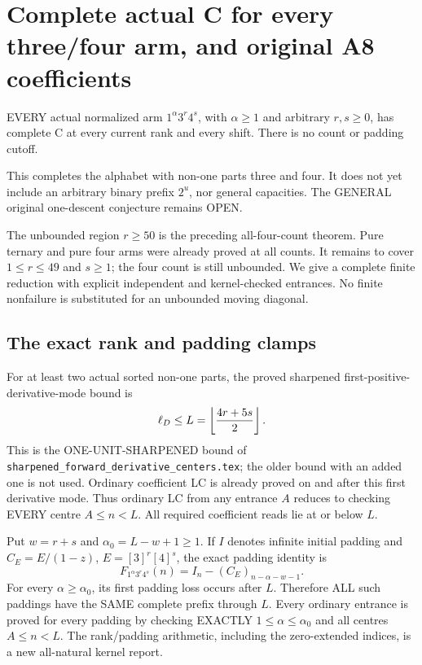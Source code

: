 \section{Complete actual C for every three/four arm, and original A8 coefficients}
\begin{theorem}
EVERY actual normalized arm $1^\alpha3^r4^s$, with
$\alpha\ge1$ and arbitrary $r,s\ge0$, has complete C at every
current rank and every shift. There is no count or padding cutoff.
\end{theorem}
This completes the alphabet with non-one parts three and four.
It does not yet include an arbitrary binary prefix $2^u$, nor general
capacities. The GENERAL original one-descent conjecture remains OPEN.

The unbounded region $r\ge50$ is the preceding all-four-count theorem.
Pure ternary and pure four arms were already proved at all counts.
It remains to cover $1\le r\le49$ and $s\ge1$; the four count is still
unbounded. We give a complete finite reduction with explicit independent
and kernel-checked entrances. No finite nonfailure is substituted for
an unbounded moving diagonal.

\subsection{The exact rank and padding clamps}
For at least two actual sorted non-one parts, the proved sharpened
first-positive-derivative-mode bound is
\[
 \ell_D\le L=\left\lfloor{4r+5s\over2}\right\rfloor.
\]
This is the ONE-UNIT-SHARPENED bound of
\texttt{sharpened\_forward\_derivative\_centers.tex}; the older bound
with an added one is not used. Ordinary coefficient LC is already
proved on and after this first derivative mode. Thus ordinary LC
from any entrance $A$ reduces to checking EVERY centre $A\le n<L$.
All required coefficient reads lie at or below $L$.

Put $w=r+s$ and $\alpha_0=L-w+1\ge1$.
If $I$ denotes infinite initial padding and $C_E=E/(1-z)$,
$E=[3]^r[4]^s$, the exact padding identity is
\[
             F_{1^\alpha3^r4^s}(n)=I_n-(C_E)_{n-\alpha-w-1}.       \tag{1}
\]
For every $\alpha\ge\alpha_0$, its first padding loss occurs after $L$.
Therefore ALL such paddings have the SAME complete prefix through $L$.
Every ordinary entrance is proved for every padding by checking
EXACTLY $1\le\alpha\le\alpha_0$ and all centres $A\le n<L$.
The rank/padding arithmetic, including the zero-extended indices, is
a new all-natural kernel report.

